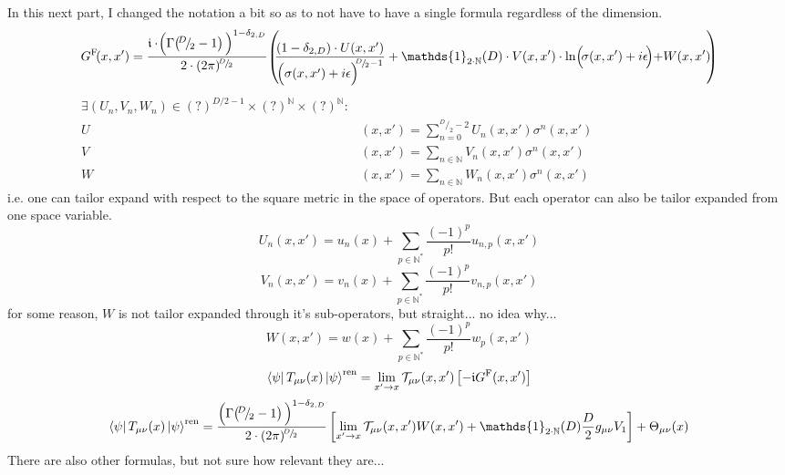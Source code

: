 \documentclass[a4paper,11pt]{article}
\numberwithin{equation}{section}
\theoremstyle{definition}
\begin{document}
In this next part, I changed the notation a bit so as to not have to have a single formula regardless of the dimension.
\begin{equation}
G^\mathrm{F}\!(x,x')=\frac{\mathfrak{i}\cdot\!\Bigl(\Gamma\!\left(\!^D\!/_{\!2}-1\right)\Bigl)^{1-\delta_{2,D}}}{2\cdot(2\pi)^{\!^D\!/_{\!2}}}\!\left(\!\!\frac{(1-\delta_{2,D})\cdot U(x,x')}{\Bigl(\sigma(x,x')+i\epsilon\Bigl)^{\!\!^D\!/_{\!2}-1}}+\mathds{1}_{2\cdot \mathbb{N}}(D) \cdot V(x,x')\cdot\mathrm{ln}\Bigl(\!\sigma(x,x')+i\epsilon\!\Bigl)+W(x,x')\!\!\right)
\end{equation}
\begin{align*}
    \exists (U_n, V_n, W_n) \in (?)^{D/2-1}\times(?)^\mathbb{N}\times(?)^\mathbb{N}:&\\
    U&(x,x')=\sum_{n=0}^{^D\!/_{\!2}-2}U_n(x,x')\sigma^n(x,x')\\
    V&(x,x')=\sum_{n\in\mathbb{N}}V_n(x,x')\sigma^n(x,x')\\
    W&(x,x')=\sum_{n\in\mathbb{N}}W_n(x,x')\sigma^n(x,x')
    \quad\quad\quad\quad\quad\quad\quad\quad\quad\quad
\end{align*}
i.e. one can tailor expand with respect to the square metric in the space of operators. But each operator can also be tailor expanded from one space variable.
\begin{equation}
    U_n(x,x')=u_n(x)+\sum_{p\in\mathbb{N}^*}\frac{(-1)^p}{p!}u_{n,p}(x,x')
\end{equation}
\begin{equation}
    V_n(x,x')=v_n(x)+\sum_{p\in\mathbb{N}^*}\frac{(-1)^p}{p!}v_{n,p}(x,x')
\end{equation}
for some reason, $W$ is not tailor expanded through it's sub-operators, but straight... \color{red}no idea why...\color{black}
\begin{equation}
    W(x,x')=w(x)+\sum_{p\in\mathbb{N}^*}\frac{(-1)^p}{p!}w_{p}(x,x')
\end{equation}
\begin{equation}
    \bra{\psi}T_{\mu\nu}(x)\ket{\psi}^\mathrm{ren} = \lim_{x'\to x} \mathcal{T}_{\mu\nu}(x,x')\left[-\mathfrak{i}G^\mathrm{F}(x,x')\right]
\end{equation}
\begin{equation}
    \bra{\psi}T_{\mu\nu}(x)\ket{\psi}^\mathrm{ren} = \frac{\Bigl(\Gamma\!\left(\!^D\!/_{\!2}-1\right)\Bigl)^{1-\delta_{2,D}}}{2\cdot(2\pi)^{\!^D\!/_{\!2}}}\left[\lim_{x'\to x}\mathcal{T}_{\mu\nu}(x,x')W(x,x')+\mathds{1}_{2\cdot \mathbb{N}}(D)\frac{D}{2}g_{\mu\nu}V_1\right]+\Theta_{\mu\nu}(x)
\end{equation}
There are also other formulas, but not sure how relevant they are...
\end{document}
